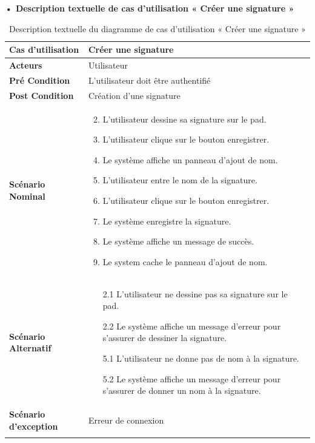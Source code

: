 \textbf{•	Description textuelle de cas d'utilisation « Créer une signature »}

\begin{longtable}{|p{5cm}|p{10cm}|}
\hline
\textbf{Cas d'utilisation}&Créer une signature\\
\hline
\textbf{Acteurs}&Utilisateur\\
\hline
\textbf{Pré Condition}&L'utilisateur doit être authentifié\\
\hline
\textbf{Post Condition}&Création d'une signature\\
\hline
\textbf{Scénario Nominal}&
\vspace{-\baselineskip}
\begin{enumerate}
    \setcounter{enumi}{1}
  \item L'utilisateur dessine sa signature sur le pad.
  \item L'utilisateur clique sur le bouton enregistrer.
  \item Le système affiche un panneau d'ajout de nom.
  \item L'utilisateur entre le nom de la signature.
  \item L'utilisateur clique sur le bouton enregistrer.
  \item Le système enregistre la signature.
  \item Le système affiche un message de succès.
  \item Le system cache le panneau d'ajout de nom.
\end{enumerate}\\
\hline
\textbf{Scénario Alternatif}&
\vspace{-\baselineskip}
\begin{enumerate}
      \item [2.1] L'utilisateur ne dessine pas sa signature sur le pad.
      \item [2.2] Le système affiche un message d'erreur pour s'assurer de dessiner la signature.
      \item [5.1] L'utilisateur ne donne pas de nom à la signature.
      \item [5.2] Le système affiche un message d'erreur pour s'assurer de donner un nom à la signature.
\end{enumerate}\\
\hline
\textbf{Scénario d'exception}&Erreur de connexion\\
\hline
\caption{Description textuelle du diagramme de cas d'utilisation « Créer une signature »}
\label{tab:use_case_create_signature}
\end{longtable}



